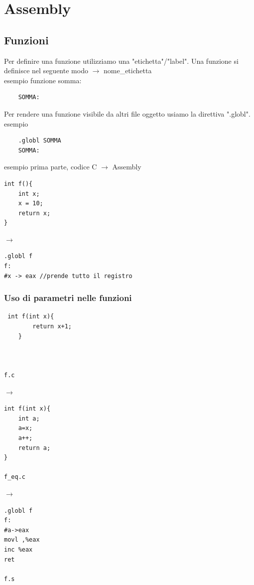 \chapter{Assembly}


\section{Funzioni}
Per definire una funzione utilizziamo una "etichetta"/"label".
Una funzione si definisce nel seguente modo $\rightarrow$ nome\_etichetta 
\\esempio funzione somma:

\begin{verbatim}
    SOMMA:
\end{verbatim}

\noindent Per rendere una funzione visibile da altri file oggetto usiamo la direttiva ".globl". esempio

\begin{verbatim}
    .globl SOMMA
    SOMMA:
\end{verbatim}

\noindent esempio prima parte, codice C $\rightarrow$ Assembly\medskip\\
\begin{minipage}{0.4\textwidth}
\begin{verbatim}
int f(){
    int x;
    x = 10;
    return x;
}
\end{verbatim}
\end{minipage}
\hfill
$\longrightarrow$
\hfill
\begin{minipage}{0.4\textwidth}
\begin{verbatim}
.globl f
f:
#x -> eax //prende tutto il registro
\end{verbatim}
\end{minipage}
\noindent

\subsection{Uso di parametri nelle funzioni}
\begin{minipage}{0.3\textwidth}
\begin{verbatim}
 int f(int x){
        return x+1;
    }


    
f.c
\end{verbatim}
\end{minipage}
\hfill
$\longrightarrow$
\hfill
\begin{minipage}{0.3\textwidth}
\begin{verbatim}
int f(int x){
    int a;
    a=x;
    a++;
    return a;
}

f_eq.c
\end{verbatim}
\end{minipage}
\hfill
$\longrightarrow$
\hfill
\begin{minipage}{0.3\textwidth}
\begin{verbatim}
.globl f
f:
#a->eax
movl ,%eax
inc %eax
ret

f.s
\end{verbatim}

\end{minipage}
\noindent
